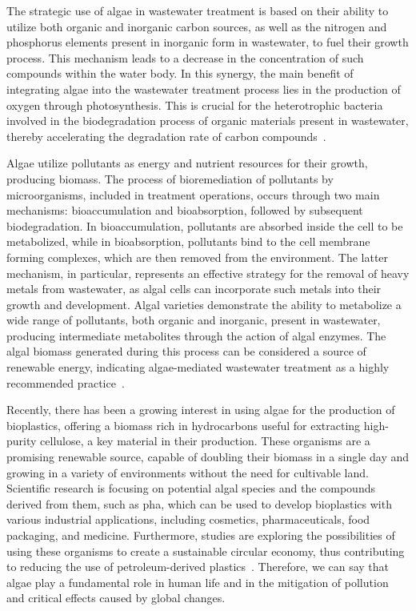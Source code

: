 The strategic use of algae in wastewater treatment is based on their ability to utilize both organic and inorganic carbon sources, as well as the nitrogen and phosphorus elements present in inorganic form in wastewater, to fuel their growth process. This mechanism leads to a decrease in the concentration of such compounds within the water body. In this synergy, the main benefit of integrating algae into the wastewater treatment process lies in the production of oxygen through photosynthesis. This  is crucial for the heterotrophic bacteria involved in the biodegradation process of organic materials present in wastewater, thereby accelerating the degradation rate of carbon compounds~\parencite{mohsenpour_Integrating_2021}.

Algae utilize pollutants as energy and nutrient resources for their growth, producing biomass. The process of bioremediation of pollutants by microorganisms, included in treatment operations, occurs through two main mechanisms: bioaccumulation and bioabsorption, followed by subsequent biodegradation. In bioaccumulation, pollutants are absorbed inside the cell to be metabolized, while in bioabsorption, pollutants bind to the cell membrane forming complexes, which are then removed from the environment. The latter mechanism, in particular, represents an effective strategy for the removal of heavy metals from wastewater, as algal cells can incorporate such metals into their growth and development. Algal varieties demonstrate the ability to metabolize a wide range of pollutants, both organic and inorganic, present in wastewater, producing intermediate metabolites through the action of algal enzymes. The algal biomass generated during this process can be considered a source of renewable energy, indicating algae-mediated wastewater treatment as a highly recommended practice~\parencite{bhatt_Algae_2022}.

Recently, there has been a growing interest in using algae for the production of bioplastics, offering a biomass rich in hydrocarbons useful for extracting high-purity cellulose, a key material in their production. These organisms are a promising renewable source, capable of doubling their biomass in a single day and growing in a variety of environments without the need for cultivable land. Scientific research is focusing on potential algal species and the compounds derived from them, such as \gls{pha}, which can be used to develop bioplastics with various industrial applications, including cosmetics, pharmaceuticals, food packaging, and medicine. Furthermore, studies are exploring the possibilities of using these organisms to create a sustainable circular economy, thus contributing to reducing the use of petroleum-derived plastics~\parencite{dang_Current_2022}. Therefore, we can say that algae play a fundamental role in human life and in the mitigation of pollution and critical effects caused by global changes.


